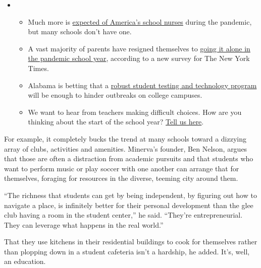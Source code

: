 \begin{itemize}
\item
  \begin{itemize}
  \tightlist
  \item
    Much more is
    \href{https://www.nytimes3xbfgragh.onion/2020/08/20/us/schools-reopening-nurses-covid.html?action=click\&pgtype=Article\&state=default\&region=MAIN_CONTENT_3\&context=storylines_keepup}{expected
    of America's school nurses} during the pandemic, but many schools
    don't have one.
  \item
    A vast majority of parents have resigned themselves to
    \href{https://www.nytimes3xbfgragh.onion/2020/08/19/us/colleges-closing-covid.html?action=click\&pgtype=Article\&state=default\&region=MAIN_CONTENT_3\&context=storylines_keepup}{going
    it alone in the pandemic school year}, according to a new survey for
    The New York Times.
  \item
    Alabama is betting that a
    \href{https://www.nytimes3xbfgragh.onion/2020/08/19/business/alabama-uab-coronavirus-tests.html?action=click\&pgtype=Article\&state=default\&region=MAIN_CONTENT_3\&context=storylines_keepup}{robust
    student testing and technology program} will be enough to hinder
    outbreaks on college campuses.
  \item
    We want to hear from teachers making difficult choices. How are you
    thinking about the start of the school year?
    \href{https://www.nytimes3xbfgragh.onion/2020/08/19/us/teachers-school-reopenings.html?action=click\&pgtype=Article\&state=default\&region=MAIN_CONTENT_3\&context=storylines_keepup}{Tell
    us here}.
  \end{itemize}
\end{itemize}

For example, it completely bucks the trend at many schools toward a
dizzying array of clubs, activities and amenities. Minerva's founder,
Ben Nelson, argues that those are often a distraction from academic
pursuits and that students who want to perform music or play soccer with
one another can arrange that for themselves, foraging for resources in
the diverse, teeming city around them.

``The richness that students can get by being independent, by figuring
out how to navigate a place, is infinitely better for their personal
development than the glee club having a room in the student center,'' he
said. ``They're entrepreneurial. They can leverage what happens in the
real world.''

That they use kitchens in their residential buildings to cook for
themselves rather than plopping down in a student cafeteria isn't a
hardship, he added. It's, well, an education.

